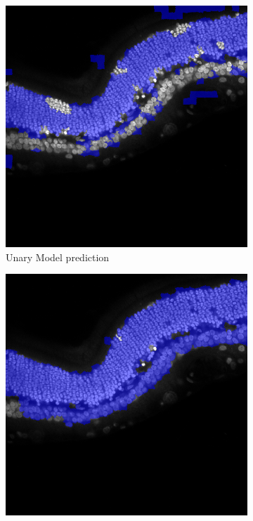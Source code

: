 \begin{figure}
\begin{subfigure}{.5\textwidth}
  \centering
  \includegraphics[width=0.9\linewidth]{images/3dnone_0-train_predict_unary.png}
  \caption{Unary Model prediction}
  \label{fig:smoothNuclieUnary}
\end{subfigure}%
\begin{subfigure}{.5\textwidth}
  \centering
  \includegraphics[width=0.9\linewidth]{images/3dnone_0-train_predict_pairwise.png}

\end{subfigure}
\end{figure}
